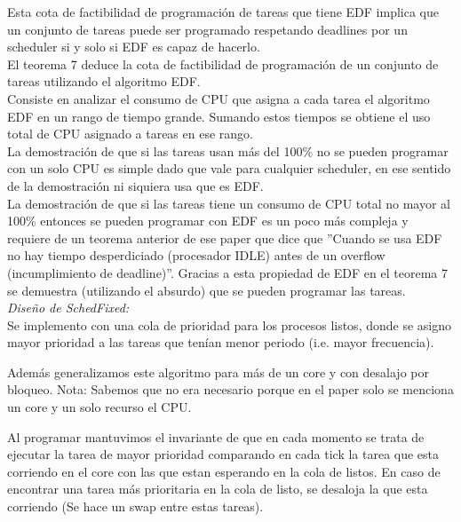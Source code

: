 Esta cota de factibilidad de programación de tareas que tiene EDF implica que un conjunto de tareas puede ser programado respetando deadlines por un scheduler si y solo si EDF es capaz de hacerlo.\\


El teorema 7 deduce la cota de factibilidad de programación de un conjunto de tareas utilizando el algoritmo EDF.\\

Consiste en analizar el consumo de CPU que asigna a cada tarea el algoritmo EDF en un rango de tiempo grande. Sumando estos tiempos se obtiene el uso total de CPU asignado a tareas en ese rango. \\

La demostración de que si las tareas usan más del 100\% no se pueden programar con un solo CPU es simple dado que vale para cualquier scheduler, en ese sentido de la demostración ni siquiera usa que es EDF. \\

La demostración de que si las tareas tiene un consumo de CPU total no mayor al 100\% entonces se pueden programar con EDF es un poco más compleja y requiere de un teorema anterior de ese paper que dice que ''Cuando se usa EDF no hay tiempo desperdiciado (procesador IDLE) antes de un overflow (incumplimiento de deadline)''. Gracias a esta propiedad de EDF en el teorema 7 se demuestra (utilizando el absurdo) que se pueden programar las tareas.\\



\noindent
\emph{Diseño de SchedFixed:} \\

Se implemento con una cola de prioridad para los procesos listos, donde se asigno mayor prioridad a las tareas que tenían menor periodo (i.e. mayor frecuencia). 

Además generalizamos este algoritmo para más de un core y con desalajo por bloqueo.
Nota: Sabemos que no era necesario porque en el paper solo se menciona un core y un solo recurso el CPU.

Al programar mantuvimos el invariante de que en cada momento se trata de ejecutar la tarea de mayor prioridad comparando en cada tick la tarea que esta corriendo en el core con las que estan esperando en la cola de listos. En caso de encontrar una tarea más prioritaria en la cola de listo, se desaloja la que esta corriendo (Se hace un swap entre estas tareas).\\


